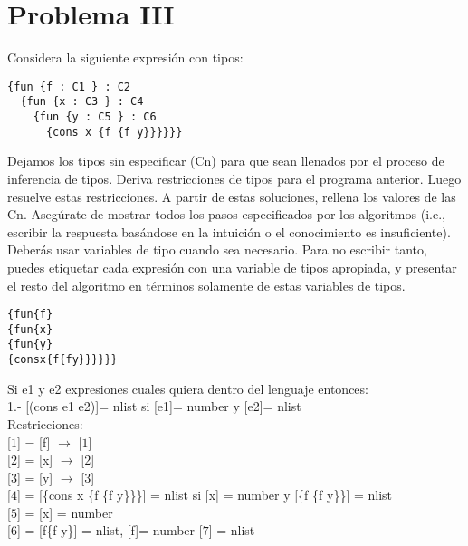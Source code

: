 \documentclass{article}
\begin{document}
  

\section*{Problema III}
Considera la siguiente expresión con tipos:

\begin{verbatim}
{fun {f : C1 } : C2
  {fun {x : C3 } : C4
    {fun {y : C5 } : C6
      {cons x {f {f y}}}}}}
\end{verbatim}

Dejamos los tipos sin especificar (Cn) para que sean llenados por el proceso
de inferencia de tipos. Deriva restricciones de tipos para el programa anterior.
Luego resuelve estas restricciones. A partir de estas soluciones, rellena los
valores de las Cn. Asegúrate de mostrar todos los pasos especificados por los
algoritmos (i.e., escribir la respuesta basándose en la intuición o el conocimiento
es insuficiente). Deberás usar variables de tipo cuando sea necesario.
Para no escribir tanto, puedes etiquetar cada expresión con una variable de tipos
apropiada, y presentar el resto del algoritmo en términos solamente de estas
variables de tipos.

\begin{alltt}
\{  fun \{f\}
  \{  fun \{x\}
    \{  fun \{y\}
      \{  cons  x   \{f  \{f y\}\}\}\}\}\}
\end{alltt}

Si e1 y e2 expresiones cuales quiera dentro del lenguaje entonces:\\
 1.- [(cons e1 e2)]= nlist si [e1]= number y [e2]= nlist\\

Restricciones:\\

[$\boxed{1}$] = [f] $\rightarrow$ [$\boxed{1}$] \\

[$\boxed{2}$] = [x] $\rightarrow$ [$\boxed{2}$] \\

[$\boxed{3}$] = [y] $\rightarrow$ [$\boxed{3}$] \\

[$\boxed{4}$] = [\{cons x \{f \{f y\}\}\}] = nlist si [x] = number y [\{f \{f y\}\}] = nlist \\

[$\boxed{5}$] = [x] = number\\

[$\boxed{6}$] = [f\{f y\}] = nlist, [f]= number [$\boxed{7}$] = nlist\\
\end{document}
